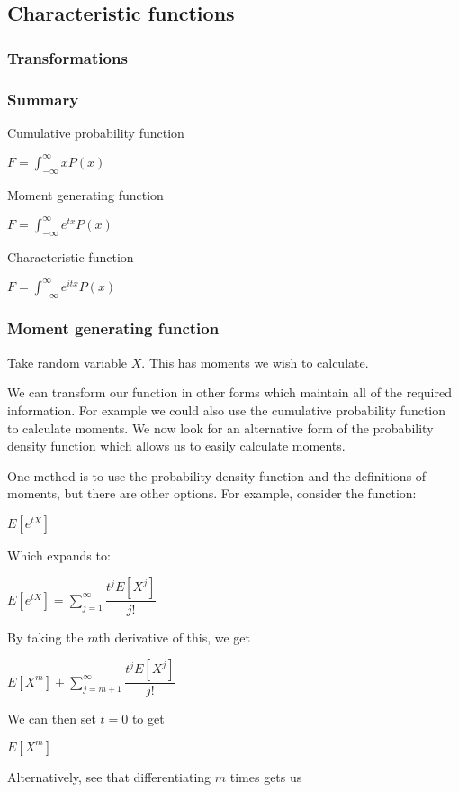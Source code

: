 
\subsection{Characteristic functions}

\subsubsection{Transformations}

\subsubsection{Summary}

Cumulative probability function

\(F=\int_{-\infty }^\infty xP(x)\)

Moment generating function

\(F=\int_{-\infty }^\infty e^{tx}P(x)\)

Characteristic function

\(F=\int_{-\infty }^\infty e^{itx}P(x)\)

\subsubsection{Moment generating function}

Take random variable \(X\). This has moments we wish to calculate.

We can transform our function in other forms which maintain all of the required information. For example we could also use the cumulative probability function to calculate moments. We now look for an alternative form of the probability density function which allows us to easily calculate moments.

One method is to use the probability density function and the definitions of moments, but there are other options. For example, consider the function:

\(E[e^{tX}]\)

Which expands to:

\(E[e^{tX}]=\sum_{j=1}^\infty \dfrac{t^jE[X^j]}{j!}\)

By taking the \(m\)th derivative of this, we get

\(E[X^m]+\sum_{j=m+1}^\infty \dfrac{t^jE[X^j]}{j!}\)

We can then set \(t=0\) to get

\(E[X^m]\)

Alternatively, see that differentiating \(m\) times gets us

